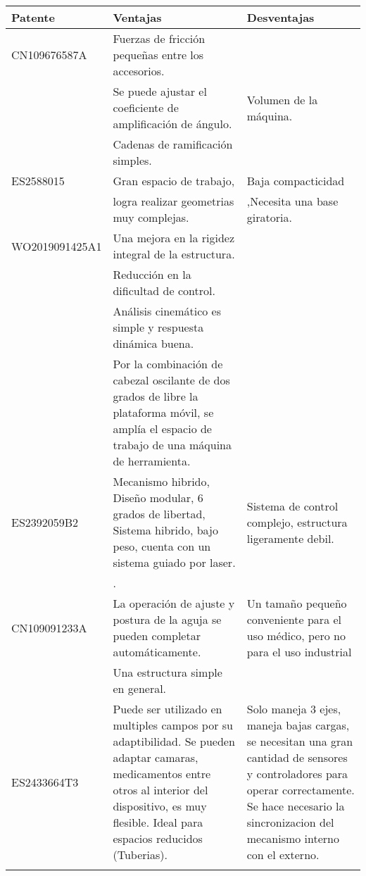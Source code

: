 \begin{longtable}{|>{\columncolor[gray]{0.85}}p{}|p{}|p{}|}
\hline \rowcolor{Gray} 
\textbf{\large Patente} & \textbf{\large Ventajas} & \textbf{\large Desventajas} \\ \hline \endhead
CN109676587A & Fuerzas de fricción pequeñas entre los accesorios. & \\
 & Se puede ajustar el coeficiente de amplificación de ángulo. & Volumen de la máquina. \\
 & Cadenas de ramificación simples. & \\ \cline{1-3}
 
ES2588015 & Gran espacio de trabajo, & Baja compacticidad \\
 & logra realizar geometrias muy complejas. & ,Necesita una base giratoria. \\ \cline{1-3}
 
WO2019091425A1 & Una mejora en la rigidez integral de la estructura. & \\
 & Reducción en la dificultad de control. & \\
 & Análisis cinemático es simple y respuesta dinámica buena. & \\
 & Por la combinación de cabezal oscilante de dos grados de libre la plataforma móvil, se amplía el espacio de trabajo de una máquina de herramienta. & \\ \cline{1-3}
 
ES2392059B2 & Mecanismo hibrido, Diseño modular, 6 grados de libertad, Sistema hibrido, bajo peso, cuenta con un sistema guiado por laser. & Sistema de control complejo, estructura ligeramente debil.\\
 & . & \\ \cline{1-3}
 
CN109091233A & La operación de ajuste y postura de la aguja se pueden completar automáticamente. & Un tamaño pequeño conveniente para el uso médico, pero no para el uso industrial \\
 & Una estructura simple en general. &  \\ \cline{1-3}

ES2433664T3 & Puede ser utilizado en multiples campos por su adaptibilidad. Se pueden adaptar camaras, medicamentos entre otros al interior del dispositivo, es muy flesible. Ideal para espacios reducidos (Tuberias). & Solo maneja 3 ejes, maneja bajas cargas, se necesitan una gran cantidad de sensores y controladores para operar correctamente. Se hace necesario la sincronizacion del mecanismo interno con el externo.
  \\ \cline{1-3}


\end{longtable}
